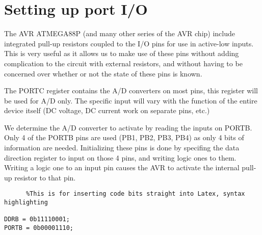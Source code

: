 \section{Setting up port I/O}



The AVR ATMEGA88P (and many other series of the AVR chip) include integrated pull-up resistors coupled to the I/O pins for use in active-low inputs. This is very useful as it allows us to make use of these pins without adding complication to the circuit with external resistors, and without having to be concerned over whether or not the state of these pins is known.

The PORTC register contains the A/D converters on most pins, this register will be used for A/D only. The specific input will vary with the function of the entire device itself (DC voltage, DC current work on separate pins, etc.)

We determine the A/D converter to activate by reading the inputs on PORTB. Only 4 of the PORTB pins are used (PB1, PB2, PB3, PB4) as only 4 bits of information are needed. Initializing these pins is done by specifing the data direction register to input on those 4 pins, and writing logic ones to them. Writing a logic one to an input pin causes the AVR to activate the internal pull-up resistor to that pin.

\begin{lstlisting}		%This is for inserting code bits straight into Latex, syntax highlighting

DDRB = 0b11110001;
PORTB = 0b00001110;
\end{lstlisting}
